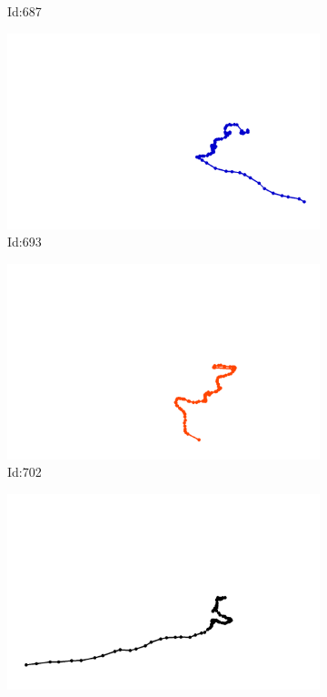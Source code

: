 \documentclass[12pt,twoside]{report}
\begin{document}
\begin{figure}
\begin{subfigure}[b]{0.20\textwidth}
\caption{Id:687}
\end{subfigure}
\begin{subfigure}[b]{0.20\textwidth}
\centering
\includegraphics[width=\textwidth]{../trajectories/693.png}
\caption{Id:693}
\end{subfigure}
\begin{subfigure}[b]{0.20\textwidth}
\centering
\includegraphics[width=\textwidth]{../trajectories/702.png}
\caption{Id:702}
\end{subfigure}
\begin{subfigure}[b]{0.20\textwidth}
\centering
\includegraphics[width=\textwidth]{../trajectories/724.png}

\end{subfigure}
\end{figure}
\end{document}
